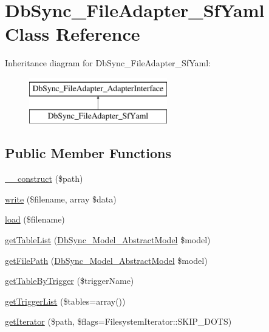 \hypertarget{classDbSync__FileAdapter__SfYaml}{
\section{DbSync\_\-FileAdapter\_\-SfYaml Class Reference}
\label{classDbSync__FileAdapter__SfYaml}
}
Inheritance diagram for DbSync\_\-FileAdapter\_\-SfYaml:\begin{figure}[H]
\begin{center}
\leavevmode
\includegraphics[height=2.000000cm]{classDbSync__FileAdapter__SfYaml}
\end{center}
\end{figure}
\subsection*{Public Member Functions}
\begin{DoxyCompactItemize}
\item 
\hyperlink{classDbSync__FileAdapter__SfYaml_acb7865b3fc2f34a6ae75403f6a88157b}{\_\-\_\-construct} (\$path)
\item 
\hyperlink{classDbSync__FileAdapter__SfYaml_a186038cd277c53d0fd7512320dd8250a}{write} (\$filename, array \$data)
\item 
\hyperlink{classDbSync__FileAdapter__SfYaml_a9a7bffcb73b3b66d27f265791dbfb44f}{load} (\$filename)
\item 
\hyperlink{classDbSync__FileAdapter__SfYaml_a338a94760851e53949c22fe0454b0c7e}{getTableList} (\hyperlink{classDbSync__Model__AbstractModel}{DbSync\_\-Model\_\-AbstractModel} \$model)
\item 
\hyperlink{classDbSync__FileAdapter__SfYaml_ae5e8cd6bf146147d55e5a28090c52d0d}{getFilePath} (\hyperlink{classDbSync__Model__AbstractModel}{DbSync\_\-Model\_\-AbstractModel} \$model)
\item 
\hyperlink{classDbSync__FileAdapter__SfYaml_a3f3f1ade545de6e0ccade4243f9e4819}{getTableByTrigger} (\$triggerName)
\item 
\hyperlink{classDbSync__FileAdapter__SfYaml_a99575fdc0db3410879efe12a8df4cf2c}{getTriggerList} (\$tables=array())
\item 
\hyperlink{classDbSync__FileAdapter__SfYaml_a56bd9eed9769e0b7122bad64e372acd6}{getIterator} (\$path, \$flags=FilesystemIterator::SKIP\_\-DOTS)
\end{DoxyCompactItemize}
